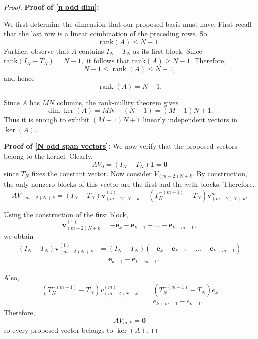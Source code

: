 \documentclass{article}
\begin{document}
\begin{proof} 

\noindent\textbf{Proof of \eqref{n odd dim}:}

We first determine the dimension that our proposed basis must have. First recall that the last row is a linear combination of the preceding rows. So
\[
\text{rank}(A)\leq N-1.
\]
Further, observe that $A$ contains $I_N-T_N$ as its first block. Since $\text{rank}(I_N-T_N)=N-1,$ it follows that $\text{rank}(A)\geq N-1.$
Therefore,
\[
N-1\leq \operatorname{rank}(A)\leq N-1,
\]
and hence
\[
\operatorname{rank}(A)=N-1.
\]


Since $A$ has $MN$ columns, the rank-nullity theorem gives
\[
\dim\ker(A)
=
MN-(N-1)
=
(M-1)N+1.
\]
Thus it is enough to exhibit $(M-1)N+1$ linearly independent vectors in $\ker(A)$.

\noindent\textbf{Proof of \eqref{N odd span vectors}:}
We now verify that the proposed vectors belong to the kernel. Clearly,
\[
AV_0=(I_N-T_N)\mathbf{1}=\mathbf{0}
\]
since $T_N$ fixes the constant vector. Now consider $V_{(m-2)N+k}$. By construction, the only nonzero blocks of this vector are the first and the $m$th blocks. Therefore,
\[
AV_{(m-2)N+k}
=
(I_N-T_N)\mathbf{v}_{(m-2)N+k}^{(1)}
+
(T_N^{-(m-1)}-T_N)\mathbf{v}_{(m-2)N+k}^{m}.
\]

Using the construction of the first block,
\[
\mathbf{v}_{(m-2)N+k}^{(1)}
=
-\mathbf{e}_k-\mathbf{e}_{k+1}-\dots-\mathbf{e}_{k+m-1},
\]
we obtain
\begin{align*}
(I_N-T_N)\mathbf{v}_{(m-2)N+k}^{(1)}
&=
(I_N-T_N)
(-\mathbf{e}_k-\mathbf{e}_{k+1}-\dots-\mathbf{e}_{k+m-1})\\
&= \mathbf{e}_{k-1}-\mathbf{e}_{k+m-1}.
\end{align*}

Also,
\[\begin{aligned}
(T_N^{-(m-1)}-T_N)v_{(m-2)N+k}^{(m)} &= (T_N^{-(m-1)}-T_N)e_k\\
&= e_{k+m-1}-e_{k-1}.
\end{aligned}\]
Therefore,
\[AV_{m,k}=\mathbf{0}\]
so every proposed vector belongs to $\ker(A)$.


\end{proof}
\end{document}
